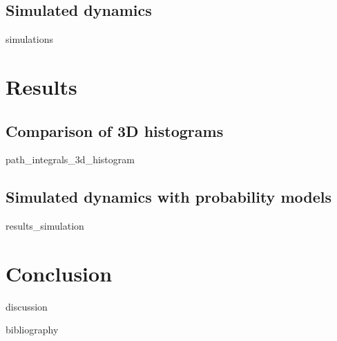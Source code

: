 \documentclass[10pt,a4paper]{report}
\begin{document}
\FloatBarrier
\section{Simulated dynamics}
	{simulations}

\FloatBarrier



\chapter{Results}

\FloatBarrier
\section{Comparison of 3D histograms}
	{path_integrals_3d_histogram}

\FloatBarrier
\section{Simulated dynamics with probability models}
	{results_simulation}



\chapter{Conclusion}

\FloatBarrier
	{discussion}




\FloatBarrier


{bibliography}
\end{document}
